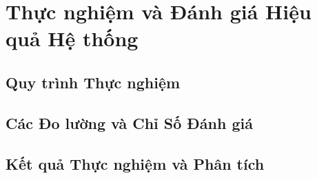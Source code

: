 \chapter{Thực nghiệm và Đánh giá Hiệu quả Hệ thống} 
\label{chap:experiments}

\section{Quy trình Thực nghiệm}

\section{Các Đo lường và Chỉ Số Đánh giá}

\section{Kết quả Thực nghiệm và Phân tích}


